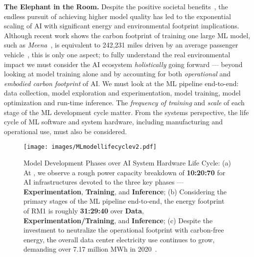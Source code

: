 \textbf{The Elephant in the Room.} 
Despite the positive societal benefits~\cite{ai-social-good}, the endless pursuit of achieving higher model quality has led to the exponential scaling of AI with significant energy and environmental footprint implications.
Although recent work shows the carbon footprint of training one large ML model, such as \emph{Meena}~\cite{Patterson:arxiv:2021}, is equivalent to 242,231 miles driven by an average passenger vehicle~\cite{GHG-calculator}, this is only one aspect; to fully understand the real environmental impact
we must consider the AI ecosystem \textit{holistically} going forward --- beyond looking at model training alone and by accounting for both \textit{operational} and \textit{embodied carbon footprint} of AI.
We must look at the ML pipeline end-to-end: data collection, model exploration and experimentation, model training, model optimization and run-time inference. 
The \textit{frequency of training} and \textit{scale} of each stage of the ML development cycle matter. 
From the systems perspective, the life cycle of ML software and system hardware, including manufacturing and operational use, must also be considered. 

\begin{figure*}[t]
    \centering
    \texttt{[image: images/MLmodellifecyclev2.pdf]}
    \caption{Model Development Phases over AI System Hardware Life Cycle: (a) At \fb, we observe a rough power capacity breakdown of \textbf{10:20:70} for AI infrastructures devoted to the three key phases --- \textbf{Experimentation}, \textbf{Training}, and \textbf{Inference}; (b) Considering the primary stages of the ML pipeline end-to-end, the energy footprint of RM1 is roughly \textbf{31:29:40} over \textbf{Data},  \textbf{Experimentation/Training}, and \textbf{Inference}; 
    (c) Despite the investment to neutralize the operational footprint with carbon-free energy, the overall data center electricity use continues to grow, demanding over 7.17 million MWh in 2020~\cite{facebook-sustainability-report}.}
    \label{fig:ml_lifecycle}
\end{figure*}

